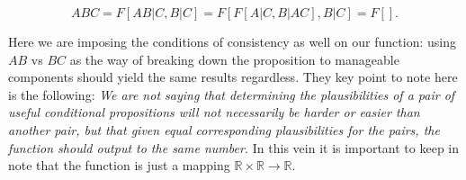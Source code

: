 \documentclass{article}
\begin{document}
\[ABC = F[AB|C, B|C] = F[F[A|C, B|AC], B|C] = F[]. \]

Here we are imposing the conditions of consistency as well on our function: using $AB$ vs $BC$ as the way of breaking down the proposition to manageable components should yield the same results regardless. They key point to note here is the following: \emph{We are not saying that determining the plausibilities of a pair of useful conditional propositions will not necessarily be harder or easier than another pair, but that given equal corresponding plausibilities for the pairs, the function should output to the same number.} In this vein it is important to keep in note that the function is just a mapping $\mathbb{R} \times \mathbb{R} \to \mathbb{R}$. 
\end{document}
